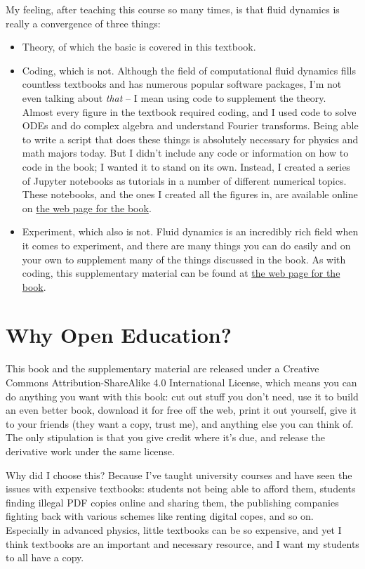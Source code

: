 \documentclass[10pt, a5paper, twoside, openany]{memoir}
\begin{document}
My feeling, after teaching this course so many times, is that fluid dynamics is really a convergence of three things: 
\begin{itemize}
\item Theory, of which the basic is covered in this textbook.
\item Coding, which is not.  Although the field of computational fluid dynamics fills countless textbooks and has numerous popular software packages, I'm not even talking about \emph{that} -- I mean using code to supplement the theory.  Almost every figure in the textbook required coding, and I used code to solve ODEs and do complex algebra and understand Fourier transforms.  Being able to write a script that does these things is absolutely necessary for physics and math majors today.  But I didn't include any code or information on how to code in the book; I wanted it to stand on its own.  Instead, I created a series of Jupyter notebooks as tutorials in a number of different numerical topics.  These notebooks, and the ones I created all the figures in, are available online on \href{https://josephmacmillan.github.io/IntroductionToFluidDynamics/index.html}{the web page for the book}.
\item Experiment, which also is not.  Fluid dynamics is an incredibly rich field when it comes to experiment, and there are many things you can do easily and on your own to supplement many of the things discussed in the book.  As with coding, this supplementary material can be found at \href{https://josephmacmillan.github.io/IntroductionToFluidDynamics/index.html}{the web page for the book}.
\end{itemize}

\section{Why Open Education?}

This book and the supplementary material are released under a Creative Commons Attribution-ShareAlike 4.0 International License, which means you can do anything you want with this book:  cut out stuff you don't need, use it to build an even better book, download it for free off the web, print it out yourself, give it to your friends (they want a copy, trust me), and anything else you can think of.  The only stipulation is that you give credit where it's due, and release the derivative work under the same license.

Why did I choose this?  Because I've taught university courses and have seen the issues with expensive textbooks: students not being able to afford them, students finding illegal PDF copies online and sharing them, the publishing companies fighting back with various schemes like renting digital copes, and so on.  Especially in advanced physics, little textbooks can be so expensive, and yet I think textbooks are an important and necessary resource, and I want my students to all have a copy.
\end{document}
